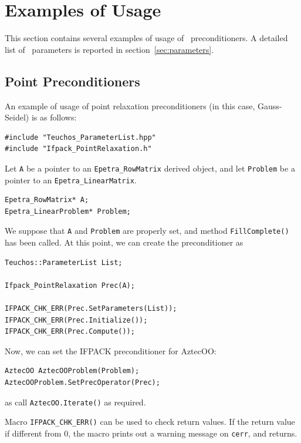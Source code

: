 \section{Examples of Usage}
\label{sec:usage}

This section contains several examples of usage of \ifpack\ preconditioners. A
detailed list of \ifpack\ parameters is reported in
section~\ref{sec:parameters}.

\subsection{Point Preconditioners}
\label{sec:point_ex}

An example of usage of point relaxation preconditioners (in this case, Gauss-Seidel) is as
follows:
\begin{verbatim}
#include "Teuchos_ParameterList.hpp"
#include "Ifpack_PointRelaxation.h"
\end{verbatim}
Let \verb!A! be a pointer to an \verb!Epetra_RowMatrix! derived object,
  and let \verb!Problem! be a pointer to an \verb!Epetra_LinearMatrix!.
\begin{verbatim}
Epetra_RowMatrix* A;  
Epetra_LinearProblem* Problem;
\end{verbatim}
We suppose that \verb!A! and 
\verb!Problem! are properly set, and
method \verb~FillComplete()~ has been called. At this point, we can create the
preconditioner as
\begin{verbatim}
Teuchos::ParameterList List;

Ifpack_PointRelaxation Prec(A);

IFPACK_CHK_ERR(Prec.SetParameters(List));
IFPACK_CHK_ERR(Prec.Initialize());
IFPACK_CHK_ERR(Prec.Compute());
\end{verbatim}
Now, we can set the IFPACK preconditioner for AztecOO:
\begin{verbatim}
AztecOO AztecOOProblem(Problem);
AztecOOProblem.SetPrecOperator(Prec);
\end{verbatim}
as call \verb!AztecOO.Iterate()! as required.

Macro \verb!IFPACK_CHK_ERR()! can be used to check return values. If the
return value if different from 0, the macro prints out a warning message on
\verb!cerr!, and returns.

